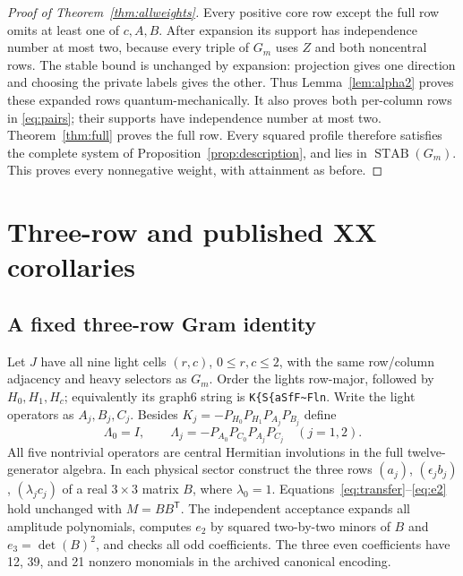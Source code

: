 \documentclass[11pt,a4paper]{article}
\theoremstyle{remark}\newtheorem{remark}[theorem]{Remark}
\newcommand{\STAB}{\operatorname{STAB}}
\begin{document}
\begin{proof}[Proof of Theorem~\ref{thm:allweights}]
Every positive core row except the full row omits at least one of
$c,A,B$. After expansion its support has independence number at most
two, because every triple of $G_m$ uses $Z$ and both noncentral rows.
The stable bound is unchanged by expansion: projection gives one
direction and choosing the private labels gives the other. Thus
Lemma~\ref{lem:alpha2} proves these expanded rows quantum-mechanically.
It also proves both per-column rows in \eqref{eq:pairs}; their supports
have independence number at most two. Theorem~\ref{thm:full} proves the
full row. Every squared profile therefore satisfies the complete system
of Proposition~\ref{prop:description}, and lies in $\STAB(G_m)$.
This proves every nonnegative weight, with attainment as before.
\end{proof}

\section{Three-row and published XX corollaries}\label{sec:xx}
\subsection{A fixed three-row Gram identity}
Let $J$ have all nine light cells $(r,c)$, $0\leq r,c\leq2$, with the
same row/column adjacency and heavy selectors as $G_m$. Order the lights
row-major, followed by $H_0,H_1,H_c$; equivalently its graph6 string is
\verb|K{S{aSfF~Fln|. Write the light operators as $A_j,B_j,C_j$.
Besides $K_j=-P_{H_0}P_{H_1}P_{A_j}P_{B_j}$ define
\[
 \Lambda_0=I,\qquad
 \Lambda_j=-P_{A_0}P_{C_0}P_{A_j}P_{C_j}\quad(j=1,2).
\]
All five nontrivial operators are central Hermitian involutions in the
full twelve-generator algebra. In each physical sector construct the
three rows $(a_j)$, $(\epsilon_jb_j)$, $(\lambda_jc_j)$ of a real
$3\times3$ matrix $B$, where $\lambda_0=1$.
Equations~\eqref{eq:transfer}--\eqref{eq:e2} hold unchanged with $M=BB^{\mathsf T}$.
The independent acceptance expands all amplitude polynomials, computes
$e_2$ by squared two-by-two minors of $B$ and $e_3=\det(B)^2$, and
checks all odd coefficients. The three even coefficients have 12, 39,
and 21 nonzero monomials in the archived canonical encoding.
\end{document}
